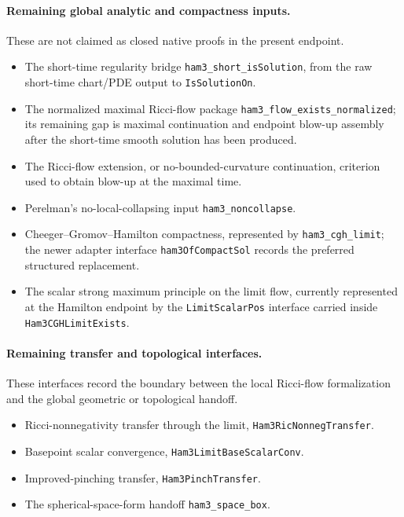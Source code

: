 \documentclass[11pt]{article}
\theoremstyle{plain}
\theoremstyle{definition}
\theoremstyle{remark}
\newcommand{\leanref}[1]{\nolinkurl{#1}}
\begin{document}
\paragraph{Remaining global analytic and compactness inputs.}
These are not claimed as closed native proofs in the present endpoint.
\begin{itemize}[leftmargin=2em]
  \item The short-time regularity bridge \leanref{ham3_short_isSolution}, from
  the raw short-time chart/PDE output to \leanref{IsSolutionOn}.
  \item The normalized maximal Ricci-flow package
  \leanref{ham3_flow_exists_normalized}; its remaining gap is maximal
  continuation and endpoint blow-up assembly after the short-time smooth
  solution has been produced.
  \item The Ricci-flow extension, or no-bounded-curvature continuation,
  criterion used to obtain blow-up at the maximal time.
  \item Perelman's no-local-collapsing input \leanref{ham3_noncollapse}.
  \item Cheeger--Gromov--Hamilton compactness, represented by
  \leanref{ham3_cgh_limit}; the newer adapter interface
  \leanref{ham3OfCompactSol} records the preferred structured replacement.
  \item The scalar strong maximum principle on the limit flow, currently
  represented at the Hamilton endpoint by the \leanref{LimitScalarPos}
  interface carried inside \leanref{Ham3CGHLimitExists}.
\end{itemize}

\paragraph{Remaining transfer and topological interfaces.}
These interfaces record the boundary between the local Ricci-flow formalization
and the global geometric or topological handoff.
\begin{itemize}[leftmargin=2em]
  \item Ricci-nonnegativity transfer through the limit,
  \leanref{Ham3RicNonnegTransfer}.
  \item Basepoint scalar convergence, \leanref{Ham3LimitBaseScalarConv}.
  \item Improved-pinching transfer, \leanref{Ham3PinchTransfer}.
  \item The spherical-space-form handoff \leanref{ham3_space_box}.
\end{itemize}
\end{document}
